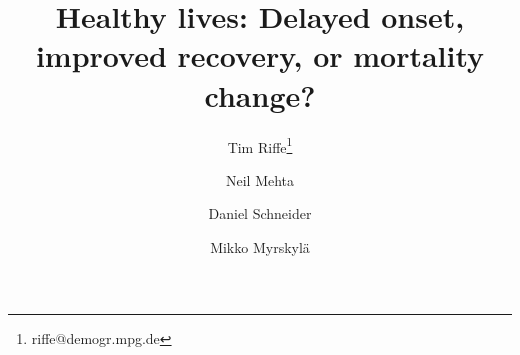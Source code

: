 \newcommand{\absdiv}[1]{%
  \par\addvspace{.5\baselineskip}%
  \noindent\textbf{#1}\quad\ignorespaces
}
\newcommand{\rd}[1]{\textcolor{red}{#1}}





\title{Healthy lives: Delayed onset, improved recovery, or mortality
change?}

\author[1]{Tim Riffe\thanks{riffe@demogr.mpg.de}}
\author[2]{Neil Mehta}
\author[1]{Daniel Schneider}
\author[1,3]{Mikko Myrskyl\"a}



%              
%

